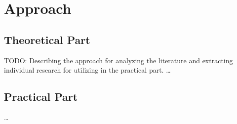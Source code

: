 \chapter{Approach}
\label{ch:Approach}

\section{Theoretical Part}
\label{ch:Approach:sec:Theoretical Part}
TODO: Describing the approach for analyzing the literature and extracting individual research for utilizing in the practical part.
\dots

\section{Practical Part}
\label{ch:Approach:sec:Practical Part}

\dots